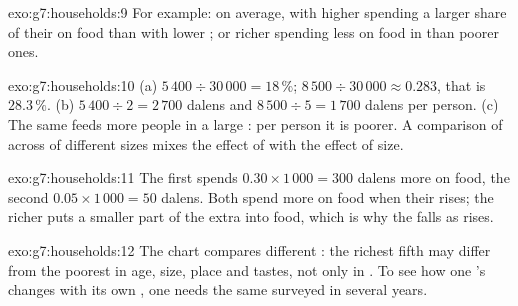 \begin{solution}{exo:g7:households:9}
For example: on average,  with higher  spending a larger share of their  on
food than  with lower ; or richer  spending less on food in  than
poorer ones.
\end{solution}

\begin{solution}{exo:g7:households:10}
(a) $5\,400 \div 30\,000 = 18\,\%$; $8\,500 \div 30\,000 \approx 0.283$, that is $28.3\,\%$.
(b) $5\,400 \div 2 = 2\,700$ dalens and $8\,500 \div 5 = 1\,700$ dalens per person. (c) The same
 feeds more people in a large : per person it is poorer. A comparison of  across  of different sizes mixes the effect of  with the effect of size.
\end{solution}

\begin{solution}{exo:g7:households:11}
The first spends $0.30 \times 1\,000 = 300$ dalens more on food, the second $0.05 \times 1\,000 =
50$ dalens. Both spend more on food when their  rises; the richer  puts a smaller
part of the extra  into food, which is why the  falls as  rises.
\end{solution}

\begin{solution}{exo:g7:households:12}
The chart compares different : the richest fifth may differ from the poorest in age, size,
place and tastes, not only in . To see how one 's  changes with its own
, one needs the same  surveyed in several years.
\end{solution}

